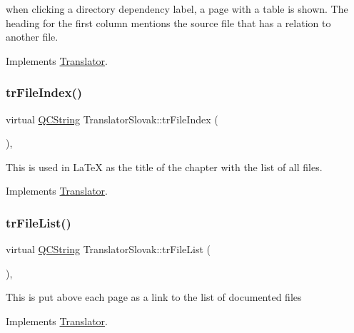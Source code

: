 when clicking a directory dependency label, a page with a table is shown. The heading for the first column mentions the source file that has a relation to another file. 

Implements \mbox{\hyperlink{class_translator}{Translator}}.

\mbox{\label{class_translator_slovak_a98aa0fcd101d50f6b3f7dbae1f0bce15}} 
\subsubsection{\texorpdfstring{trFileIndex()}{trFileIndex()}}
{\footnotesize\ttfamily virtual \mbox{\hyperlink{class_q_c_string}{Q\+C\+String}} Translator\+Slovak\+::tr\+File\+Index (\begin{DoxyParamCaption}{ }\end{DoxyParamCaption})\hspace{0.3cm}{\ttfamily [inline]}, {\ttfamily [virtual]}}

This is used in La\+TeX as the title of the chapter with the list of all files. 

Implements \mbox{\hyperlink{class_translator}{Translator}}.

\mbox{\label{class_translator_slovak_a85dd434bc6d5c2016aedb6de83360a6c}} 
\subsubsection{\texorpdfstring{trFileList()}{trFileList()}}
{\footnotesize\ttfamily virtual \mbox{\hyperlink{class_q_c_string}{Q\+C\+String}} Translator\+Slovak\+::tr\+File\+List (\begin{DoxyParamCaption}{ }\end{DoxyParamCaption})\hspace{0.3cm}{\ttfamily [inline]}, {\ttfamily [virtual]}}

This is put above each page as a link to the list of documented files 

Implements \mbox{\hyperlink{class_translator}{Translator}}.

\mbox{\label{class_translator_slovak_a23d05c7c9af036548cec928cb66b9def}} 

